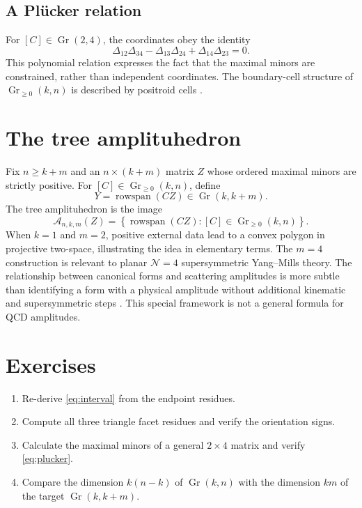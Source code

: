 \documentclass[11pt,a4paper]{article}
\newcommand{\Gr}{\operatorname{Gr}}
\begin{document}
\subsection{A Pl\"ucker relation}
For $[C]\in\Gr(2,4)$, the coordinates obey the identity
\begin{equation}
\Delta_{12}\Delta_{34}
-\Delta_{13}\Delta_{24}
+\Delta_{14}\Delta_{23}=0.
\label{eq:plucker}
\end{equation}
This polynomial relation expresses the fact that the maximal
minors are constrained, rather than independent coordinates.
The boundary-cell structure of $\Gr_{\geq0}(k,n)$ is described
by positroid cells \cite{Postnikov}.

\section{The tree amplituhedron}
Fix $n\geq k+m$ and an $n\times(k+m)$ matrix $Z$
whose ordered maximal minors are strictly positive.
For $[C]\in\Gr_{\geq0}(k,n)$, define
\begin{equation}
Y=\operatorname{rowspan}(CZ)\in\Gr(k,k+m).
\end{equation}
The tree amplituhedron is the image
\begin{equation}
\boxed{\mathcal A_{n,k,m}(Z)=
\left\{\operatorname{rowspan}(CZ):
[C]\in\Gr_{\geq0}(k,n)\right\}.}
\label{eq:amplituhedron}
\end{equation}
When $k=1$ and $m=2$, positive external data lead
to a convex polygon in projective two-space, illustrating the idea
in elementary terms. The $m=4$ construction is relevant
to planar $\mathcal N=4$ supersymmetric Yang--Mills theory.
The relationship between canonical forms and scattering
amplitudes is more subtle than identifying a form with a
physical amplitude without additional kinematic and
supersymmetric steps \cite{AT,ABCGPT}.
This special framework is not a general formula for QCD amplitudes.

\section{Exercises}
\begin{enumerate}[label=\arabic*.]
\item Re-derive \eqref{eq:interval} from the endpoint residues.
\item Compute all three triangle facet residues and verify
the orientation signs.
\item Calculate the maximal minors of a general $2\times4$
matrix and verify \eqref{eq:plucker}.
\item Compare the dimension $k(n-k)$ of $\Gr(k,n)$ with
the dimension $km$ of the target $\Gr(k,k+m)$.
\end{enumerate}
\end{document}
